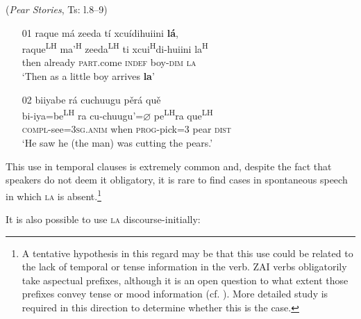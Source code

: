 \newpage 
\ea\label{temporal2} (\textit{Pear Stories}, Ts: l.8--9)
\begin{itemize}
\item[01]
\glll raque m\'{a} zeeda t\'{i} xcu\'{i}dihuiini \textbf{l\'{a}},  \\
raque\textsuperscript{LH} ma'\textsuperscript{H} zeeda\textsuperscript{LH} ti xcui\textsuperscript{H}di-huiini la\textsuperscript{H}  \\
then already \textsc{part}.come \textsc{indef} boy-\textsc{dim} \textsc{la}  \\
\glt `Then as a little boy arrives \textbf{la}'  


\item[02]
\glll biiyabe r\'{a} cuchuugu p\v{e}r\'{a} qu\v{e}  \\
bi-iya=be\textsuperscript{LH} ra cu-chuugu'=$\varnothing$ pe\textsuperscript{LH}ra que\textsuperscript{LH}  \\
\textsc{compl}-see=3\textsc{sg.anim} when \textsc{prog}-pick=3 pear \textsc{dist}  \\
\glt `He saw he (the man) was cutting the pears.' 

\end{itemize}
\z
This use in temporal clauses is extremely common and, despite the fact that speakers do not deem it obligatory, it is rare to find cases in spontaneous speech in which \textsc{la} is absent.\footnote{A tentative hypothesis in this regard may be that this use could be related to the lack of temporal or tense information in the verb. ZAI verbs obligatorily take aspectual prefixes, although it is an open question to what extent those prefixes convey tense or mood information (cf. ). More detailed study is required in this direction to determine whether this is the case.}

It is also possible to use \textsc{la} discourse-initially:


